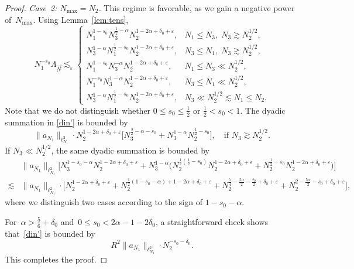 \documentclass[11pt,reqno,english]{amsart}
\numberwithin{equation}{section}
\theoremstyle{plain}
\theoremstyle{definition}
\theoremstyle{remark}
\begin{document}
\begin{proof}
		\emph{Case~2: $N_{\max}=N_{2}$.}
		This regime is favorable, as we gain a negative power of~$N_{\max}$.
		Using Lemma~\ref{lem:tens},
		\[
		N_1^{-s_0}\Lambda_{\vec{N}}
		\lesssim_{\varepsilon}
		\begin{cases}
			N_1^{1-s_0}N_3^{\frac{1}{2}-\alpha}
			N_2^{1-2\alpha+\delta_0+\varepsilon}, & N_1\leq N_3,\; N_3\gtrsim N_2^{1/2},\\
			N_3^{1-\alpha}N_1^{\frac{1}{2}-s_0}
			N_2^{1-2\alpha+\delta_0+\varepsilon}, & N_3\leq N_1,\; N_3\gtrsim N_2^{1/2},\\
			N_1^{1-s_0}N_3^{-\alpha}N_2^{1-2\alpha+\delta_0+\varepsilon}, & N_1\leq N_3\ll N_2^{1/2},\\
			N_1^{-s_0}N_3^{1-\alpha}N_2^{1-2\alpha+\delta_0+\varepsilon}, & N_3\leq N_1\ll N_2^{1/2},\\
	        N_3^{1-\alpha}N_1^{\frac{1}{2}-s_0}
			N_2^{1-2\alpha+\delta_0+\varepsilon}, & N_3\ll N_2^{1/2}\lesssim N_1\leq N_2.
		\end{cases}
		\]
	Note that we do not distinguish whether $0\leq s_0\leq \frac{1}{2}$ or $\frac{1}{2}<s_0<1$. The dyadic summation in \eqref{din'} is bounded by
		\[
		\|a_{N_1}\|_{\ell_{N_1}^2}\cdot N_2^{1-2\alpha+\delta_0+\varepsilon}\big[N_3^{\frac{3}{2}-\alpha-s_0}+N_3^{1-\alpha}N_2^{\frac{1}{2}-s_0}\big],\quad \text{if } N_3\gtrsim N_2^{1/2}.
		\]
		If $N_3\ll N_2^{1/2}$, the same dyadic summation is bounded by
		\begin{align*}
		&\|a_{N_1}\|_{\ell_{N_1}^2}\big[N_3^{1-s_0-\alpha}N_2^{1-2\alpha+\delta_0+\varepsilon}
		+N_3^{1-\alpha}\big(N_2^{\frac{1}{2}(\frac{1}{2}-s_0)}N_2^{1-2\alpha+\delta_0+\varepsilon}+N_2^{\frac{1}{2}-s_0}N_2^{1-2\alpha+\delta_0+\varepsilon} \big)
		\big]\\
		\lesssim & 
		\|a_{N_1}\|_{\ell_{N_1}^2}\cdot \big[N_2^{1-2\alpha+\delta_0+\varepsilon}+N_2^{\frac{1}{2}(1-s_0-\alpha)+1-2\alpha+\delta_0+\varepsilon}+N_2^{\frac{7}{4}-\frac{5\alpha}{2}-\frac{s_0}{2}+\delta_0+\varepsilon }
		+N_2^{2-\frac{5\alpha}{2}-s_0+\delta_0+\varepsilon}  \big],
		\end{align*}
	where we distinguish two cases according to the sign of $1-s_0-\alpha$.
	
	 
		For~$\alpha>\frac{5}{6}+\delta_0$ and~$0\leq s_0<2\alpha-1-2\delta_0$, a straightforward check shows that~\eqref{din'} is bounded by
		\[
		R^2\|a_{N_1}\|_{\ell_{N_1}^2}\cdot N_2^{-s_0-\delta_0}.
		\]
		This completes the proof.
	\end{proof}
	
	
\end{document}
